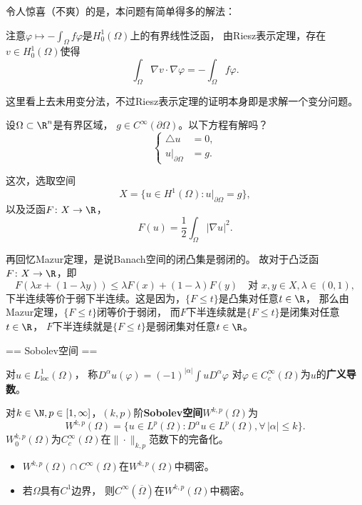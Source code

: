 令人惊喜（不爽）的是，本问题有简单得多的解法：

注意$\varphi \mapsto -\int_\Omega f\varphi$是$H_0^1(\Omega)$上的有界线性泛函，
由Riesz表示定理，存在$v\in H_0^1(\Omega)$使得
\[\int_\Omega \nabla v\cdot\nabla\varphi=-\int_\Omega f\varphi.\]

这里看上去未用变分法，不过Riesz表示定理的证明本身即是求解一个变分问题。

\begin{problem}
    设$\Omega\subset\R^n$是有界区域，
    $g\in C^\infty(\partial\Omega)$。以下方程有解吗？
    \begin{equation*}
        \left\{\begin{aligned}
            \triangle u&=0,\\
            u|_{\partial\Omega}&=g.
        \end{aligned}\right.
    \end{equation*}
\end{problem}
这次，选取空间
\[X=\{u\in H^1(\Omega): u|_{\partial\Omega}=g\},\]
以及泛函$F\colon X\to\R$，
\[F(u)=\frac{1}{2}\int_\Omega|\nabla u|^2.\]

再回忆Mazur定理，是说Banach空间的闭凸集是弱闭的。
故对于凸泛函$F\colon X\to\R$，即
\[F(\lambda x+(1-\lambda y))\le\lambda F(x)+(1-\lambda)F(y)
\quad\text{对 }x,y\in X,\lambda\in(0,1),\]
下半连续等价于弱下半连续。这是因为，$\{F\le t\}$是凸集对任意$t\in\R$，
那么由Mazur定理，$\{F\le t\}$闭等价于弱闭，
而$F$下半连续就是$\{F\le t\}$是闭集对任意$t\in\R$，
$F$下半连续就是$\{F\le t\}$是弱闭集对任意$t\in\R$。


== Sobolev空间 ==

\begin{definition}
    对$u\in L^1_{\text{loc}}(\Omega)$，
    称$D^\alpha u(\varphi)=(-1)^{|\alpha|}\int uD^\alpha\varphi$
    对$\varphi\in C_c^\infty(\Omega)$为$u$的\textbf{广义导数}。
\end{definition}

\begin{definition}
    对$k\in\N,p\in[1,\infty]$，$(k,p)$阶\textbf{Sobolev空间}$W^{k,p}(\Omega)$为
    \[W^{k,p}(\Omega)=\{u\in L^p(\Omega):
    D^\alpha u\in L^p(\Omega),\forall\,|\alpha|\le k\}.\]
    $W_0^{k,p}(\Omega)$为$C_c^\infty(\Omega)$在$\|\cdot\|_{k,p}$范数下的完备化。
\end{definition}

\begin{theorem}
    \begin{itemize}
        \item $W^{k,p}(\Omega)\cap C^\infty(\Omega)$在$W^{k,p}(\Omega)$中稠密。
        \item 若$\Omega$具有$C^1$边界，
        则$C^\infty(\overline{\Omega})$在$W^{k,p}(\Omega)$中稠密。
    \end{itemize}
\end{theorem}

